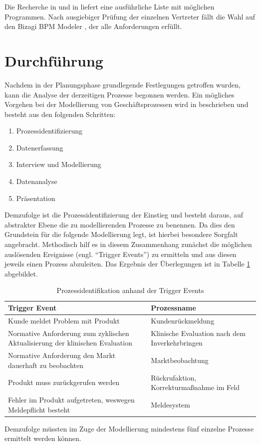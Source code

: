 \documentclass[a4paper,12pt]{report}
\begin{document}
Die Recherche in \citep[][]{Hesse} und in \citep[][]{Naef2012} liefert eine ausführliche Liste mit möglichen Programmen. Nach ausgiebiger Prüfung der einzelnen Vertreter fällt die Wahl auf den Bizagi BPM Modeler \citep[][]{Bizagi}, der alle Anforderungen erfüllt.

\section{Durchführung}\label{sec:durchfuehrung}
Nachdem in der Planungsphase grundlegende Festlegungen getroffen wurden, kann die Analyse der derzeitigen Prozesse begonnen werden. Ein mögliches Vorgehen bei der Modellierung von Geschäftsprozessen wird in \citep[vgl.][S. 13-17]{Jacka2009} beschrieben und besteht aus den folgenden Schritten:
\begin{enumerate}
\item Prozessidentifizierung
\item Datenerfassung
\item Interview und Modellierung
\item Datenanalyse
\item Präsentation
\end{enumerate}
Demzufolge ist die Prozessidentifizierung der Einstieg und besteht daraus, auf abstrakter Ebene die zu modellierenden Prozesse zu benennen. Da dies den Grundstein für die folgende Modellierung legt, ist hierbei besondere Sorgfalt angebracht. Methodisch hilf es in diesem Zusammenhang zunächst die möglichen auslösenden Ereignisse (engl. "`Trigger Events"') zu ermitteln und aus diesen jeweils einen Prozess abzuleiten. Das Ergebnis der Überlegungen ist in Tabelle \ref{tab:trigger_events} abgebildet.
\begin{table}[ht]
\begin{center}
\begin{tabular}{|p{}|p{}|}
\hline
Trigger Event & Prozessname \\
\hline\hline
Kunde meldet Problem mit Produkt & Kundenrückmeldung \\
\hline
Normative Anforderung zum zyklischen Aktualisierung der klinischen Evaluation & Klinische Evaluation nach dem Inverkehrbringen \\
\hline
Normative Anforderung den Markt dauerhaft zu beobachten & Marktbeobachtung \\
\hline
Produkt muss zurückgerufen werden & Rückrufaktion, Korrekturmaßnahme im Feld\\
\hline
Fehler im Produkt aufgetreten, weswegen Meldepflicht besteht & Meldesystem\\
\hline
\end{tabular}
\caption[Prozessidentifikation anhand der Trigger Events]{Prozessidentifikation anhand der Trigger Events}
\label{tab:trigger_events}
\end{center}
\end{table}
Demzufolge müssten im Zuge der Modellierung mindestens fünf einzelne Prozesse ermittelt werden können.
\end{document}
